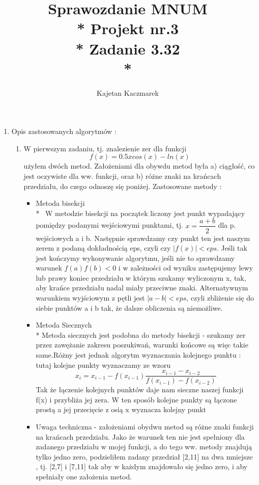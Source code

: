 \documentclass[a4paper, 11pt]{article}
\author{Kajetan Kaczmarek}
\begin{document}
\title{Sprawozdanie MNUM \\* Projekt nr.3 \\* 
Zadanie 3.32 \\*}
\maketitle

\begin{enumerate}

\item Opis zastosowanych algorytmów : 
\begin{enumerate}
\item W pierwszym zadaniu, tj. znalezienie zer dla funkcji \[f(x) = 0.5xcos(x) - ln(x) \] użyłem dwóch metod. Założeniami dla obywdu metod była a) ciągłość, co jest oczywiste dla ww. funkcji, oraz b) różne znaki na krańcach przedziału, do czego odnoszę się poniżej. Zastosowane metody : 
\begin{itemize} \, \item Metoda bisekcji \\* \, W metodzie bisekcji na początek liczony jest punkt wypadający pomiędzy podanymi wejściowymi punktami, tj. \( x = \dfrac{a+b}{2}\) dla p. wejściowych a i b. Następnie sprawdzamy czy punkt ten jest naszym zerem z podaną dokładnością eps, czyli czy \( |f(x)| < eps \). Jeśli tak jest kończymy wykonywanie algorytmu, jeśli nie to sprawdzamy warunek \( f(a) f(b) < 0 \) i w zależności od wyniku zastępujemy lewy lub prawy koniec przedziału w którym szukamy wyliczonym x, tak, aby krańce przedziału nadal miały przeciwne znaki. Alternatywnym warunkiem wyjściowym z pętli jest \( |a-b|<eps \), czyli zbliżenie się do siebie punktów a i b tak, że dalsze obliczenia są niemożliwe.
\item Metoda Siecznych \\* Metoda siecznych jest podobna do metody bisekcji - szukamy zer przez zawężanie zakresu poszukiwań, warunki końcowe są więc takie same.Różny jest jednak algorytm wyznaczania kolejnego punktu : tutaj kolejne punkty wyznaczamy ze wzoru \[ x_i = x_{i-1} - f(x_{i-1})\dfrac{x_{i-1} - x_{i-2}}{f(x_{i-1}) - f(x_{i-2})} \]
Tak że łączenie kolejnych punktów daje nam sieczne naszej funkcji f(x) i przybliża jej zera. W ten sposób kolejne punkty są łączone prostą a jej przecięcie z osią x wyznacza kolejny punkt
\item Uwaga techniczna - założeniami obydwu metod są różne znaki funkcji na krańcach przedziału. Jako że warunek ten nie jest spełniony dla zadanego przedziału w mojej funkcji, a do tego ww. metody znajdują tylko jedno zero, podzieliłem zadany przedział [2,11] na dwa mniejsze , tj. [2,7] i [7,11] tak aby w każdym znajdowało się jedno zero, i aby spełniały one założenia metod.

\end{itemize}
\end{enumerate}
\end{enumerate}
\end{document}
